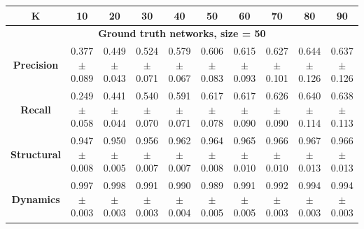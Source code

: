 \begin{table}[h!]
\centering
\small
\renewcommand{\arraystretch}{1.4}
\begin{tabular}{|c|c|c|c|c|c|c|c|c|c|}
\hline
\textbf{K} & 10 & 20 & 30 & 40 & 50 & 60 & 70 & 80 & 90 \\
\hline
\multicolumn{10}{|c|}{\textbf{Ground truth networks, size = 50}} \\
\hline
\textbf{Precision} & \makecell{0.377\\$\pm$0.089} & \makecell{0.449\\$\pm$0.043} & \makecell{0.524\\$\pm$0.071} & \makecell{0.579\\$\pm$0.067} & \makecell{0.606\\$\pm$0.083} & \makecell{0.615\\$\pm$0.093} & \makecell{0.627\\$\pm$0.101} & \makecell{0.644\\$\pm$0.126} & \makecell{0.637\\$\pm$0.126} \\
\textbf{Recall} & \makecell{0.249\\$\pm$0.058} & \makecell{0.441\\$\pm$0.044} & \makecell{0.540\\$\pm$0.070} & \makecell{0.591\\$\pm$0.071} & \makecell{0.617\\$\pm$0.078} & \makecell{0.617\\$\pm$0.090} & \makecell{0.626\\$\pm$0.090} & \makecell{0.640\\$\pm$0.114} & \makecell{0.638\\$\pm$0.113} \\
\textbf{Structural} & \makecell{0.947\\$\pm$0.008} & \makecell{0.950\\$\pm$0.005} & \makecell{0.956\\$\pm$0.007} & \makecell{0.962\\$\pm$0.007} & \makecell{0.964\\$\pm$0.008} & \makecell{0.965\\$\pm$0.010} & \makecell{0.966\\$\pm$0.010} & \makecell{0.967\\$\pm$0.013} & \makecell{0.966\\$\pm$0.013} \\
\textbf{Dynamics} & \makecell{0.997\\$\pm$0.003} & \makecell{0.998\\$\pm$0.003} & \makecell{0.991\\$\pm$0.003} & \makecell{0.990\\$\pm$0.004} & \makecell{0.989\\$\pm$0.005} & \makecell{0.991\\$\pm$0.005} & \makecell{0.992\\$\pm$0.003} & \makecell{0.994\\$\pm$0.003} & \makecell{0.994\\$\pm$0.003} \\

\end{tabular}
\end{table}
